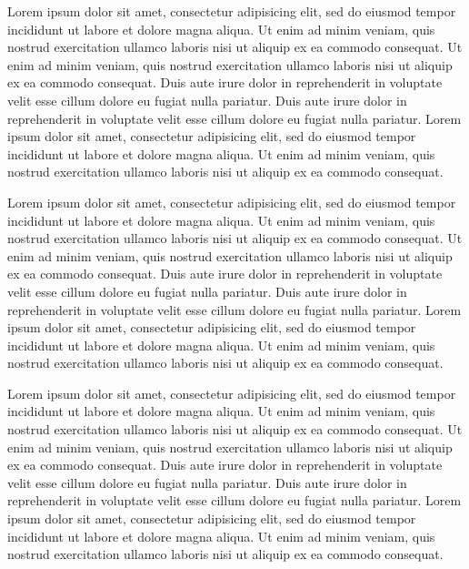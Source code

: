\documentclass[11pt]{wade}
\date{30 February, 2026} %
\begin{document}


\printopening[leftright]

Lorem ipsum dolor sit amet, consectetur adipisicing elit, sed do eiusmod tempor incididunt ut labore et dolore magna aliqua. Ut enim ad minim veniam, quis nostrud exercitation ullamco laboris nisi ut aliquip ex ea commodo consequat. Ut enim ad minim veniam, quis nostrud exercitation ullamco laboris nisi ut aliquip ex ea commodo consequat. Duis aute irure dolor in reprehenderit in voluptate velit esse cillum dolore eu fugiat nulla pariatur. Duis aute irure dolor in reprehenderit in voluptate velit esse cillum dolore eu fugiat nulla pariatur. Lorem ipsum dolor sit amet, consectetur adipisicing elit, sed do eiusmod tempor incididunt ut labore et dolore magna aliqua. Ut enim ad minim veniam, quis nostrud exercitation ullamco laboris nisi ut aliquip ex ea commodo consequat.

Lorem ipsum dolor sit amet, consectetur adipisicing elit, sed do eiusmod tempor incididunt ut labore et dolore magna aliqua. Ut enim ad minim veniam, quis nostrud exercitation ullamco laboris nisi ut aliquip ex ea commodo consequat. Ut enim ad minim veniam, quis nostrud exercitation ullamco laboris nisi ut aliquip ex ea commodo consequat. Duis aute irure dolor in reprehenderit in voluptate velit esse cillum dolore eu fugiat nulla pariatur. Duis aute irure dolor in reprehenderit in voluptate velit esse cillum dolore eu fugiat nulla pariatur. Lorem ipsum dolor sit amet, consectetur adipisicing elit, sed do eiusmod tempor incididunt ut labore et dolore magna aliqua. Ut enim ad minim veniam, quis nostrud exercitation ullamco laboris nisi ut aliquip ex ea commodo consequat.

Lorem ipsum dolor sit amet, consectetur adipisicing elit, sed do eiusmod tempor incididunt ut labore et dolore magna aliqua. Ut enim ad minim veniam, quis nostrud exercitation ullamco laboris nisi ut aliquip ex ea commodo consequat. Ut enim ad minim veniam, quis nostrud exercitation ullamco laboris nisi ut aliquip ex ea commodo consequat. Duis aute irure dolor in reprehenderit in voluptate velit esse cillum dolore eu fugiat nulla pariatur. Duis aute irure dolor in reprehenderit in voluptate velit esse cillum dolore eu fugiat nulla pariatur. Lorem ipsum dolor sit amet, consectetur adipisicing elit, sed do eiusmod tempor incididunt ut labore et dolore magna aliqua. Ut enim ad minim veniam, quis nostrud exercitation ullamco laboris nisi ut aliquip ex ea commodo consequat.
\end{document}
